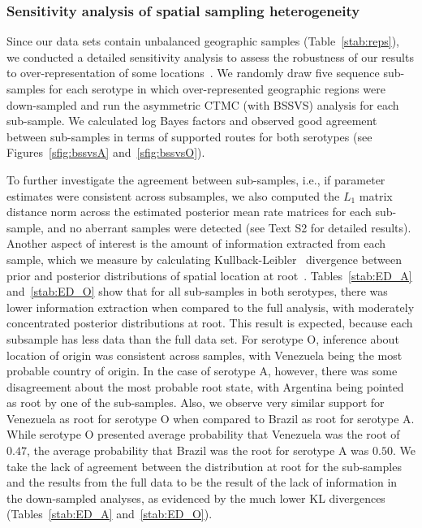 \documentclass[10pt]{article}
\begin{document}
\subsubsection*{Sensitivity analysis of spatial sampling heterogeneity}

Since our data sets contain unbalanced geographic samples (Table~\ref{stab:reps}), we conducted a detailed sensitivity analysis to assess the robustness of our results to over-representation of some locations~\cite{Faria2012, fluPNAS, Bedford2010, polar}.
We randomly draw five sequence sub-samples for each serotype in which over-represented geographic regions were down-sampled and run the asymmetric CTMC (with BSSVS) analysis for each sub-sample.
We calculated log Bayes factors and observed good agreement between sub-samples in terms of supported routes for both serotypes (see Figures~\ref{sfig:bssvsA} and~\ref{sfig:bssvsO}). 

To further investigate the agreement between sub-samples, i.e., if parameter estimates were consistent across subsamples, we also computed the $L_1$ matrix distance norm across the estimated posterior mean rate matrices for each sub-sample, and no aberrant samples were detected (see Text S2 for detailed results).
Another aspect of interest is the amount of information extracted from each sample, which we measure by calculating Kullback-Leibler~\cite{KL} divergence between prior and posterior distributions of spatial location at root~\cite{roots}.
Tables~\ref{stab:ED_A} and~\ref{stab:ED_O} show that for all sub-samples in both serotypes, there was lower information extraction when compared to the full analysis, with moderately concentrated posterior distributions at root.
This result is expected, because each subsample has less data than the full data set.
For serotype O, inference about location of origin was consistent across samples, with Venezuela being the most probable country of origin.
In the case of serotype A, however, there was some disagreement about the most probable root state, with Argentina being pointed as root by one of the sub-samples.
Also, we observe very similar support for Venezuela as root for serotype O when compared to Brazil as root for serotype A.
While serotype O presented average probability that Venezuela was the root of $0.47$, the average probability that Brazil was the root for serotype A was $0.50$.
We take the lack of agreement between the distribution at root for the sub-samples and the results from the full data to be the result of the lack of information in the down-sampled analyses, as evidenced by the much lower KL divergences (Tables~\ref{stab:ED_A} and~\ref{stab:ED_O}). 
\end{document}
